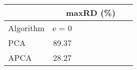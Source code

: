 \begin{table}[h]
\newcommand{\cpca}{\cellcolor{cyan!20}}
\newcommand{\capca}{\cellcolor{green!20}}
\newcommand{\cfr}{\cellcolor{yellow!25}}
\newcommand{\cgzip}{\cellcolor{orange!20}}
\newcommand{\cca}{\cellcolor{violet!20}}
\newcommand{\best}{\cellcolor{gray!30}}
\centering\hspace*{0cm}\begin{tabular}{| l | c | c | c | c | c | c | c | c |}\cline{2-9}\multicolumn{1}{c|}{}& \multicolumn{8}{c|}{maxRD (\%)}\\\hline
{Algorithm} & {e = 0} \\\hline
{PCA\cpca} & {89.37} \\\hline
{APCA\capca} & {\best28.27} \\\hline
\end{tabular}
\caption{\captionminmaxone}
\label{experiments:minmaxone}
\end{table}

